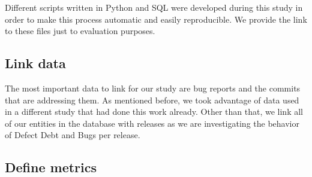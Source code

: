 Different scripts written in Python and SQL were developed during this study in order to make this process automatic and easily reproducible. We provide the link to these files just to evaluation purposes.

\subsection{Link data}

The most important data to link for our study are bug reports and the commits that are addressing them. As mentioned before, we took advantage of data used in a different study that had done this work already. Other than that, we link all of our entities in the database with releases as we are investigating the behavior of Defect Debt and Bugs per release. 

\subsection{Define metrics}


